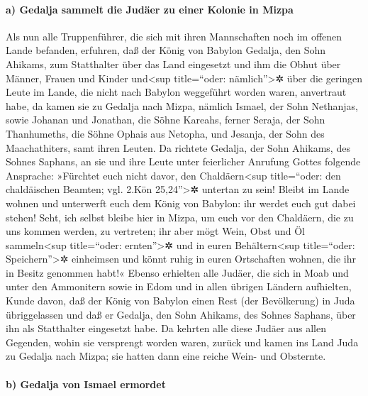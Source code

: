 \hypertarget{a-gedalja-sammelt-die-juduxe4er-zu-einer-kolonie-in-mizpa}{%
\paragraph{a) Gedalja sammelt die Judäer zu einer Kolonie in
Mizpa}\label{a-gedalja-sammelt-die-juduxe4er-zu-einer-kolonie-in-mizpa}}

Als nun alle Truppenführer, die sich mit ihren
Mannschaften noch im offenen Lande befanden, erfuhren, daß der König von
Babylon Gedalja, den Sohn Ahikams, zum Statthalter über das Land
eingesetzt und ihm die Obhut über Männer, Frauen und Kinder
und\textless sup title=``oder: nämlich''\textgreater✲ über die geringen
Leute im Lande, die nicht nach Babylon weggeführt worden waren,
anvertraut habe, da kamen sie zu Gedalja nach Mizpa,
nämlich Ismael, der Sohn Nethanjas, sowie Johanan und Jonathan, die
Söhne Kareahs, ferner Seraja, der Sohn Thanhumeths, die Söhne Ophais aus
Netopha, und Jesanja, der Sohn des Maachathiters, samt ihren Leuten.
Da richtete Gedalja, der Sohn Ahikams, des Sohnes Saphans,
an sie und ihre Leute unter feierlicher Anrufung Gottes folgende
Ansprache: »Fürchtet euch nicht davor, den Chaldäern\textless sup
title=``oder: den chaldäischen Beamten; vgl. 2.Kön 25,24''\textgreater✲
untertan zu sein! Bleibt im Lande wohnen und unterwerft euch dem König
von Babylon: ihr werdet euch gut dabei stehen! Seht, ich
selbst bleibe hier in Mizpa, um euch vor den Chaldäern, die zu uns
kommen werden, zu vertreten; ihr aber mögt Wein, Obst und Öl
sammeln\textless sup title=``oder: ernten''\textgreater✲ und in euren
Behältern\textless sup title=``oder: Speichern''\textgreater✲ einheimsen
und könnt ruhig in euren Ortschaften wohnen, die ihr in Besitz genommen
habt!« Ebenso erhielten alle Judäer, die sich in Moab und
unter den Ammonitern sowie in Edom und in allen übrigen Ländern
aufhielten, Kunde davon, daß der König von Babylon einen Rest (der
Bevölkerung) in Juda übriggelassen und daß er Gedalja, den Sohn Ahikams,
des Sohnes Saphans, über ihn als Statthalter eingesetzt habe.
Da kehrten alle diese Judäer aus allen Gegenden, wohin
sie versprengt worden waren, zurück und kamen ins Land Juda zu Gedalja
nach Mizpa; sie hatten dann eine reiche Wein- und Obsternte.

\hypertarget{b-gedalja-von-ismael-ermordet}{%
\paragraph{b) Gedalja von Ismael
ermordet}\label{b-gedalja-von-ismael-ermordet}}

